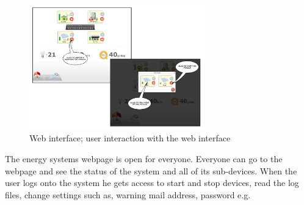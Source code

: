 		\begin{figure}[h!]		%
			\begin{centering}
				 \includegraphics[width=0.68\textwidth]{images/web_interface2.jpg}
				\caption{Web interface; user interaction with the web interface}
		 	\end{centering}
		\end{figure}			
		The energy systems webpage is open for everyone. Everyone can go to the webpage and see the status of the system and all of its sub-devices.
		When the user logs onto the system he gets access to start and stop devices, read the log files, change settings such as, warning mail address,
		password e.g.
